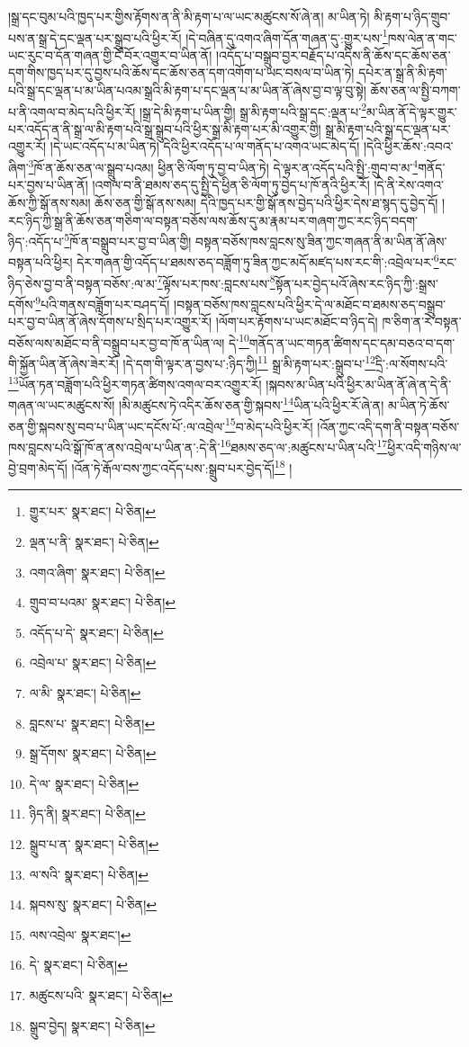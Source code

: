 །སྒྲ་དང་བུམ་པའི་ཁྱད་པར་གྱིས་རྟོགས་ན་ནི་མི་རྟག་པ་ལ་ཡང་མཚུངས་སོ་ཞེ་ན། མ་ཡིན་ཏེ། མི་རྟག་པ་ཉིད་གྲུབ་པས་ན་སྒྲ་དེ་དང་ལྡན་པར་སྒྲུབ་པའི་ཕྱིར་རོ། །དེ་བཞིན་དུ་འགའ་ཞིག་དོན་གཞན་དུ་:གྱུར་པས་\footnote{གྱུར་པར་  སྣར་ཐང་།  པེ་ཅིན། }ཁས་ལེན་ན་གང་ཡང་རུང་བ་དོན་གཞན་གྱི་ངོ་བོར་འགྱུར་བ་ཡིན་ནོ། །འདོད་པ་བསྒྲུབ་བྱར་བརྗོད་པ་འདིས་ནི་ཆོས་དང་ཆོས་ཅན་དག་གིས་ཁྱད་པར་དུ་བྱས་པའི་ཆོས་དང་ཆོས་ཅན་དག་འགོག་པ་ཡང་བསལ་བ་ཡིན་ཏེ། དཔེར་ན་སྒྲ་ནི་མི་རྟག་པའི་སྒྲ་དང་ལྡན་པ་མ་ཡིན་པའམ་སྒྲའི་མི་རྟག་པ་དང་ལྡན་པ་མ་ཡིན་ནོ་ཞེས་བྱ་བ་ལྟ་བུ་སྟེ། ཆོས་ཅན་ལ་སྤྱི་བཀག་པ་ནི་འགལ་བ་མེད་པའི་ཕྱིར་རོ། །སྒྲ་དེ་མི་རྟག་པ་ཡིན་གྱི། སྒྲ་མི་རྟག་པའི་སྒྲ་དང་:ལྡན་པ་\footnote{ལྡན་པ་ནི་  སྣར་ཐང་།  པེ་ཅིན། }མ་ཡིན་ནོ་དེ་ལྟར་གྱུར་པར་འདོད་ན་ནི་སྒྲ་ལ་མི་རྟག་པའི་སྒྲ་སྒྲུབ་པའི་ཕྱིར་སྒྲ་མི་རྟག་པར་མི་འགྱུར་གྱི། སྒྲ་མི་རྟག་པའི་སྒྲ་དང་ལྡན་པར་འགྱུར་རོ། །དེ་ཡང་འདོད་པ་མ་ཡིན་ཏེ། དེའི་ཕྱིར་འདོད་པ་ལ་གནོད་པ་འགའ་ཡང་མེད་དོ། །དེའི་ཕྱིར་ཆོས་:འབའ་ཞིག་\footnote{འགའ་ཞིག་  སྣར་ཐང་།  པེ་ཅིན། }ཁོ་ན་ཆོས་ཅན་ལ་སྒྲུབ་པའམ། ཕྱིན་ཅི་ལོག་ཏུ་བྱ་བ་ཡིན་ཏེ། དེ་ལྟར་ན་འདོད་པའི་སྤྱི་:གྲུབ་བ་མ་\footnote{གྲུབ་བ་པའམ་  སྣར་ཐང་།  པེ་ཅིན། }གནོད་པར་བྱས་པ་ཡིན་ནོ། །འགལ་བ་ནི་ཐམས་ཅད་དུ་སྤྱི་དེ་ཕྱིན་ཅི་ལོག་ཏུ་བྱེད་པ་ཁོ་ནའི་ཕྱིར་རོ། །དེ་ནི་རེས་འགའ་ཆོས་ཀྱི་སྒོ་ནས་སམ། ཆོས་ཅན་གྱི་སྒོ་ནས་སམ། དེའི་ཁྱད་པར་གྱི་སྒོ་ནས་བྱེད་པའི་ཕྱིར་དེས་ཐ་སྙད་དུ་བྱེད་དོ། །རང་ཉིད་ཀྱི་སྒྲ་ནི་ཆོས་ཅན་གཅིག་ལ་བསྟན་བཅོས་ལས་ཆོས་དུ་མ་རྣམ་པར་གཞག་ཀྱང་རང་ཉིད་བདག་ཉིད་:འདོད་པ་\footnote{འདོད་པ་དེ་  སྣར་ཐང་།  པེ་ཅིན། }ཁོ་ན་བསྒྲུབ་པར་བྱ་བ་ཡིན་གྱི། བསྟན་བཅོས་ཁས་བླངས་སུ་ཟིན་ཀྱང་གཞན་ནི་མ་ཡིན་ནོ་ཞེས་བསྟན་པའི་ཕྱིར། དེར་གཞན་གྱི་འདོད་པ་ཐམས་ཅད་བཟློག་ཏུ་ཟིན་ཀྱང་མདོ་མཛད་པས་རང་གི་:འབྲེལ་པར་\footnote{འབྲེལ་པ་  སྣར་ཐང་།  པེ་ཅིན། }རང་ཉིད་ཅེས་བྱ་བ་ནི་བསྟན་བཅོས་:ལ་མ་\footnote{ལ་མི་  སྣར་ཐང་།  པེ་ཅིན། }ལྟོས་པར་ཁས་:བླངས་པས་\footnote{བླངས་པ་  སྣར་ཐང་།  པེ་ཅིན། }སྟོན་པར་བྱེད་པའོ་ཞེས་རང་ཉིད་ཀྱི་:སྒྲས་དགོས་\footnote{སྒྲ་དོགས་  སྣར་ཐང་།  པེ་ཅིན། }པའི་གནས་བཟློག་པར་བཤད་དོ། །བསྟན་བཅོས་ཁས་བླངས་པའི་ཕྱིར་དེ་ལ་མཐོང་བ་ཐམས་ཅད་བསྒྲུབ་པར་བྱ་བ་ཡིན་ནོ་ཞེས་དོགས་པ་སྲིད་པར་འགྱུར་རོ། །ལོག་པར་རྟོགས་པ་ཡང་མཐོང་བ་ཉིད་དེ། ཁ་ཅིག་ན་རེ་བསྟན་བཅོས་ལས་མཐོང་བ་ནི་བསྒྲུབ་པར་བྱ་བ་ཁོ་ན་ཡིན་ལ། དེ་\footnote{དེ་ལ་  སྣར་ཐང་།  པེ་ཅིན། }གནོད་ན་ཡང་གཏན་ཚིགས་དང་དམ་བཅའ་བ་དག་གི་སྐྱོན་ཡིན་ནོ་ཞེས་ཟེར་རོ། །དེ་དག་གི་ལྟར་ན་བྱས་པ་:ཉིད་ཀྱི།\footnote{ཉིད་ནི།  སྣར་ཐང་།  པེ་ཅིན། } སྒྲ་མི་རྟག་པར་:སྒྲུབ་པ་\footnote{སྒྲུབ་པ་ན་  སྣར་ཐང་།  པེ་ཅིན། }དྲི་:ལ་སོགས་པའི་\footnote{ལ་སའི་  སྣར་ཐང་།  པེ་ཅིན། }ཡོན་ཏན་བཟློག་པའི་ཕྱིར་གཏན་ཚིགས་འགལ་བར་འགྱུར་རོ། །སྐབས་མ་ཡིན་པའི་ཕྱིར་མ་ཡིན་ནོ་ཞེ་ན་དེ་ནི་གཞན་ལ་ཡང་མཚུངས་སོ། །མི་མཚུངས་ཏེ་འདིར་ཆོས་ཅན་གྱི་སྐབས་\footnote{སྐབས་སུ་  སྣར་ཐང་།  པེ་ཅིན། }ཡིན་པའི་ཕྱིར་རོ་ཞེ་ན། མ་ཡིན་ཏེ་ཆོས་ཅན་གྱི་སྐབས་སུ་བབ་པ་ཡིན་ཡང་དངོས་པོ་:ལ་འབྲེལ་\footnote{ལས་འབྲེལ་  སྣར་ཐང་། }བ་མེད་པའི་ཕྱིར་རོ། །འོན་ཀྱང་འདི་དག་ནི་བསྟན་བཅོས་ཁས་བླངས་པའི་སྒོ་ཁོ་ན་ནས་འབྲེལ་པ་ཡིན་ན་:དེ་ནི་\footnote{དེ་  སྣར་ཐང་།  པེ་ཅིན། }ཐམས་ཅད་ལ་:མཚུངས་པ་ཡིན་པའི་\footnote{མཚུངས་པའི་  སྣར་ཐང་།  པེ་ཅིན། }ཕྱིར་འདི་གཉིས་ལ་བྱེ་བྲག་མེད་དོ། །འོན་ཏེ་རྒོལ་བས་ཀྱང་འདོད་པས་:སྒྲུབ་པར་བྱེད་དོ།\footnote{སྒྲུབ་བྱེད།  སྣར་ཐང་།  པེ་ཅིན། } །
